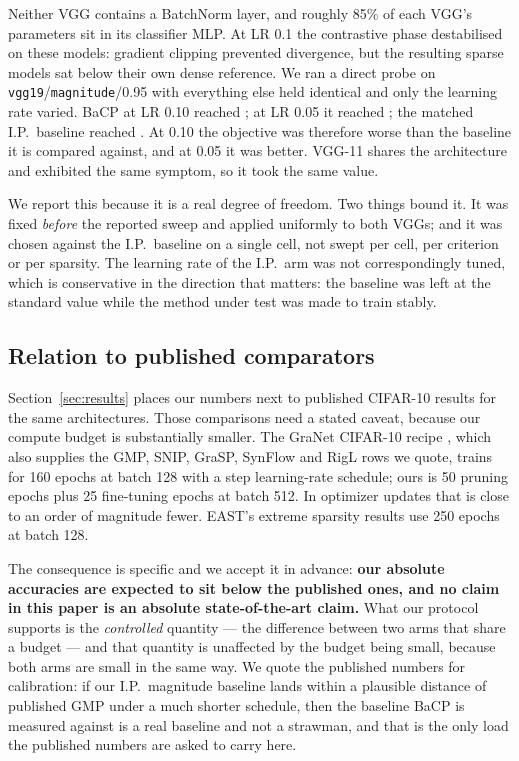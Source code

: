 Neither VGG contains a BatchNorm layer, and roughly 85\% of each VGG's parameters
sit in its classifier MLP. At LR 0.1 the contrastive phase destabilised on these
models: gradient clipping prevented divergence, but the resulting sparse models
sat below their own dense reference. We ran a direct probe on
\texttt{vgg19}/\texttt{magnitude}/0.95 with everything else held identical and
only the learning rate varied. BaCP at LR 0.10 reached
; at LR 0.05 it reached
; the matched I.P.\ baseline reached
. At 0.10 the objective was therefore worse
than the baseline it is compared against, and at 0.05 it was better. VGG-11
shares the architecture and exhibited the same symptom, so it took the same
value.

We report this because it is a real degree of freedom. Two things bound it. It
was fixed \emph{before} the reported sweep and applied uniformly to both VGGs; and
it was chosen against the I.P.\ baseline on a single cell, not swept per cell,
per criterion or per sparsity. The learning rate of the I.P.\ arm was not
correspondingly tuned, which is conservative in the direction that matters: the
baseline was left at the standard value while the method under test was made to
train stably.

\subsection{Relation to published comparators}
\label{sec:experiments:budget}

Section~\ref{sec:results} places our numbers next to published CIFAR-10 results
for the same architectures. Those comparisons need a stated caveat, because our
compute budget is substantially smaller. The GraNet CIFAR-10 recipe
\citep{liu2021granet}, which also supplies the GMP, SNIP, GraSP, SynFlow and RigL
rows we quote, trains for 160 epochs at batch 128 with a step learning-rate
schedule; ours is 50 pruning epochs plus 25 fine-tuning epochs at batch 512. In
optimizer updates that is close to an order of magnitude fewer. EAST's extreme
sparsity results \citep{li2025east} use 250 epochs at batch 128.

The consequence is specific and we accept it in advance: \textbf{our absolute
accuracies are expected to sit below the published ones, and no claim in this
paper is an absolute state-of-the-art claim.} What our protocol supports is the
\emph{controlled} quantity --- the difference between two arms that share a budget
--- and that quantity is unaffected by the budget being small, because both arms
are small in the same way. We quote the published numbers for calibration: if our
I.P.\ magnitude baseline lands within a plausible distance of published GMP under
a much shorter schedule, then the baseline BaCP is measured against is a real
baseline and not a strawman, and that is the only load the published numbers are
asked to carry here.
